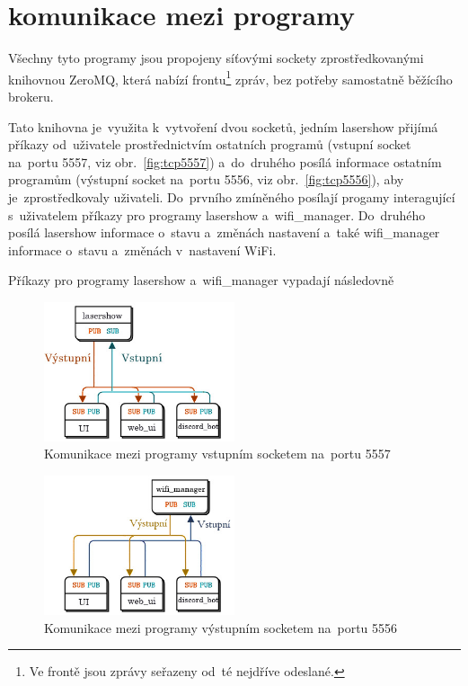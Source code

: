 \section{komunikace mezi programy}\label{sec:comms}
Všechny tyto programy jsou propojeny síťovými sockety zprostředkovanými knihovnou ZeroMQ, která nabízí frontu\footnote{Ve frontě jsou zprávy seřazeny od~té nejdříve odeslané.} zpráv, bez potřeby samostatně běžícího brokeru.

Tato knihovna je~využita k~vytvoření dvou socketů, jedním lasershow přijímá příkazy od~uživatele prostřednictvím ostatních programů (vstupní socket na~portu 5557, viz obr.~\ref{fig:tcp5557}) a~do~druhého posílá informace ostatním programům (výstupní socket na~portu 5556, viz obr.~\ref{fig:tcp5556}), aby je~zprostředkovaly uživateli.
Do~prvního zmíněného posílají progamy interagující s~uživatelem příkazy pro programy lasershow a~wifi\_manager. Do~druhého posílá lasershow informace o~stavu a~změnách nastavení  a~také wifi\_manager informace o~stavu a~změnách v~nastavení WiFi.

Příkazy pro programy lasershow a~wifi\_manager vypadají následovně

\begin{figure}[htb]
  \centering
  \includegraphics[width=0.5\textwidth]{img/comms_lasershow_scheme.jpg}
  \caption{\label{fig:lasershow_comms} Komunikace mezi programy vstupním socketem na~portu 5557}
\end{figure}
\begin{figure}[htb]
  \centering
  \includegraphics[width=0.5\textwidth]{img/comms_wifiman_scheme.jpg}
  \caption{\label{fig:wifiman_comms} Komunikace mezi programy výstupním socketem na~portu 5556}
\end{figure}